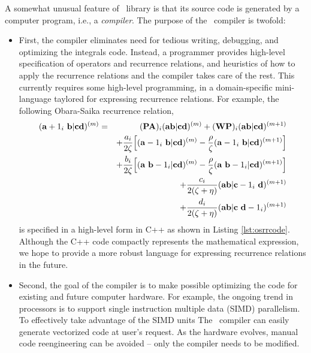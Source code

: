 \documentclass[10pt]{article}
\begin{document}
A somewhat unusual feature of \LIBINT\ library is that its source code is
generated by a computer program, i.e., a {\em compiler}. The purpose of the
\LIBINT\ compiler is twofold:
\begin{itemize}
\item First, the compiler eliminates need for tedious writing,
debugging, and optimizing the integrals code.
Instead, a programmer provides high-level specification of
operators and recurrence relations,
and heuristics of how to apply the recurrence relations and the compiler takes care of the rest.
This currently requires some high-level programming, in a domain-specific
mini-language taylored for expressing recurrence relations. For example, the
following Obara-Saika recurrence relation,\cite{Obara86}
\begin{eqnarray}
\label{eq:osvrrA}
({\bf a}+1_i\ {\bf b}| {\bf c} {\bf d})^{(m)} & = &
({\bf PA})_i ({\bf a} {\bf b}| {\bf c} {\bf d})^{(m)} +
({\bf WP})_i ({\bf a} {\bf b}| {\bf c} {\bf d})^{(m+1)} \nonumber \\
& & +
\frac{a_i}{2 \zeta} \Bigl[
({\bf a}-1_i\ {\bf b}| {\bf c} {\bf d})^{(m)} - \frac{\rho}{\zeta}
({\bf a}-1_i\ {\bf b}| {\bf c} {\bf d})^{(m+1)} \Bigr] \nonumber \\
& & +
\frac{b_i}{2 \zeta} \Bigl[
({\bf a}\ {\bf b}-1_i| {\bf c} {\bf d})^{(m)} - \frac{\rho}{\zeta}
({\bf a}\ {\bf b}-1_i| {\bf c} {\bf d})^{(m+1)} \Bigr] \nonumber \\
& & +
\frac{c_i}{2 (\zeta+\eta)}
({\bf a} {\bf b}| {\bf c}-1_i\ {\bf d})^{(m+1)} \nonumber \\
& & +
\frac{d_i}{2 (\zeta+\eta)}
({\bf a} {\bf b}| {\bf c}\ {\bf d}-1_i)^{(m+1)}
\end{eqnarray}
is specified in a high-level form in C++ as shown in Listing \ref{lst:osrrcode}.
Although the C++ code compactly represents the mathematical expression, we hope
to provide a more robust language for expressing recurrence relations in the
future.
\item Second, the goal of the compiler is to make possible optimizing the code
for existing and future computer hardware. For example, the ongoing trend in
processors is to support single instruction multiple data (SIMD)
parallelism. To effectively take advantage of the SIMD units
The \LIBINT\ compiler can easily generate vectorized code at user's request.
As the hardware evolves, manual code reengineering can be avoided --
only the compiler needs to be modified.
\end{itemize}
\end{document}
